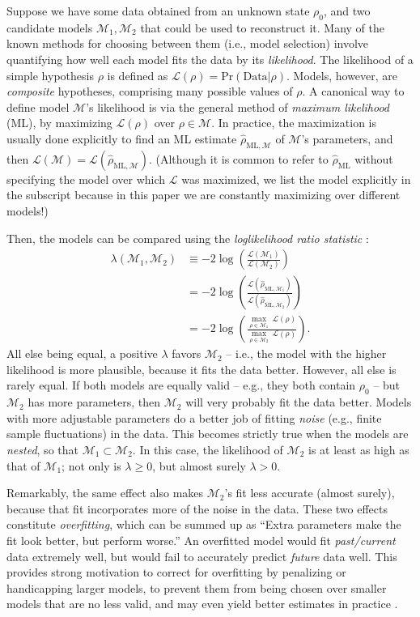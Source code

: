 \documentclass[aps,pra, twocolumn]{revtex4-1}
\newcommand{\M}{\mathcal{M}}
\newcommand{\cL}{\mathcal{L}}
\newcommand{\rhohat}{\hat{\rho}}
\newcommand{\rhoML}[1]{\rhohat_{\scriptscriptstyle{\mathrm{ML},#1}}}
\begin{document}
Suppose we have some data obtained from an unknown state $\rho_{0}$, and two candidate models $\M_{1}, \M_{2}$ that could be used to reconstruct it.  Many of the known methods for choosing between them (i.e., model selection) involve quantifying how well each model fits the data by its \emph{likelihood}.  The likelihood of a simple hypothesis $\rho$ is defined as $\mathcal{L}(\rho) = \mathrm{Pr}(\mathrm{Data}|\rho)$.  Models, however, are \emph{composite} hypotheses, comprising many possible values of $\rho$.  A canonical way to define model $\M$'s likelihood is via the general method of \emph{maximum likelihood} (ML), by maximizing $\cL(\rho)$ over $\rho\in\M$.  In practice, the maximization is usually done explicitly to find an ML estimate $\hat{\rho}_{\mathrm{ML},\M}$ \cite{Hradil1997, JamesPRA2001, Blume-Kohout2010} of $\M$'s parameters, and then $\cL(\M) = \cL(\hat{\rho}_{\mathrm{ML},\M})$.  (Although it is common to refer to $\hat\rho_{\mathrm{ML}}$ without specifying the model over which $\cL$ was maximized, we list the model explicitly in the subscript because in this paper we are constantly maximizing over different models!)

Then, the models can be compared using the \emph{loglikelihood ratio statistic} \cite{Neyman1933, Blume-Kohout2010, Moroder2013}:
\begin{align}
\lambda(\M_{1}, \M_{2}) &\equiv -2 \log \left(\frac{\cL(\M_{1})}{\cL(\M_{2})}\right)\\
&= -2 \log \left(\frac{\cL(\rhoML{\M_{1}})}{\cL(\rhoML{\M_{2}})}\right)\\
&= -2 \log \left(\frac{\underset{\rho \in \M_{1}}{\max}~\cL(\rho)}{\underset{\rho \in \M_{2}}{\max}~\cL(\rho)}\right).
\end{align}
All else being equal, a positive $\lambda$ favors $\M_2$ -- i.e., the model with the higher likelihood is more plausible, because it fits the data better.  However, all else is rarely equal.  If both models are equally valid -- e.g., they both contain $\rho_0$ -- but $\M_2$ has more parameters, then $\M_2$ will very probably fit the data better.  Models with more adjustable parameters do a better job of fitting \emph{noise} (e.g., finite sample fluctuations) in the data.  This becomes strictly true when the models are \emph{nested}, so that $\M_{1} \subset \M_{2}$.  In this case, the likelihood of $\M_{2}$ is at least as high as that of $\M_{1}$;  not only is $\lambda \geq 0$, but almost surely $\lambda > 0$.

Remarkably, the same effect also makes $\M_{2}$'s fit less accurate (almost surely), because that fit incorporates more of the noise in the data.  These two effects constitute \emph{overfitting}, which can be summed up as ``Extra parameters make the fit look better, but perform worse.''  An overfitted model would fit \emph{past/current} data extremely well,  but would fail to accurately predict \emph{future} data well. This provides strong motivation to correct for overfitting by penalizing or handicapping larger models, to prevent them from being chosen over smaller models that are no less valid, and may even yield better estimates in practice \cite{Akaike1974}.
\end{document}
